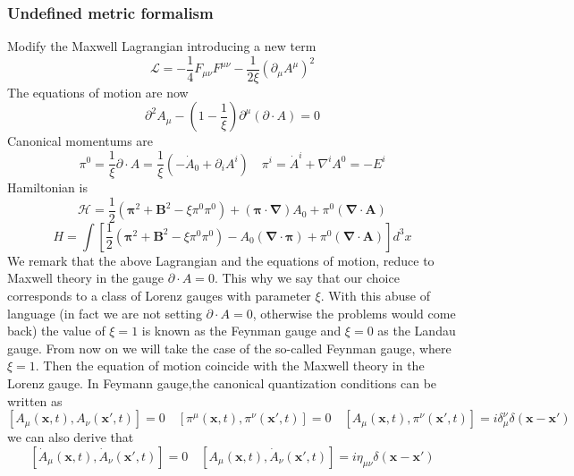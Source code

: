 \subsubsection{Undefined metric formalism}
\noindent
Modify the Maxwell Lagrangian introducing a new term
\[\mathcal{L} = -\frac{1}{4} F_{\mu\nu}F^{\mu\nu} - \frac{1}{2\xi} (\partial_{\mu} A^{\mu})^2\]
The equations of motion are now
\[\partial^2 A_{\mu} - (1-\frac{1}{\xi})\partial^{\mu}(\partial \cdot A) = 0\]
Canonical momentums are
\[\pi^0 = \frac{1}{\xi} \partial \cdot A = \frac{1}{\xi}(-\dot{A}_0 + \partial_i A^i) \quad \pi^i = \dot{A}^i + \nabla^i A^0 = -E^i\]
Hamiltonian is
\[\mathcal{H} = \frac{1}{2}(\bm{\pi}^2 + \bm{B}^2 - \xi \pi^0 \pi^0) + (\bm{\pi} \cdot \bm{\nabla}) A_0 + \pi^0 (\bm{\nabla} \cdot \bm{A})\]
\[H =  \int \left[ \frac{1}{2}(\bm{\pi}^2 + \bm{B}^2 - \xi \pi^0 \pi^0) -A_0(\bm{\nabla} \cdot \bm{\pi}) + \pi^0 (\bm{\nabla} \cdot \bm{A}) \right] d^3x \]
We remark that the above Lagrangian and the equations of motion, reduce to Maxwell theory in the gauge $\partial \cdot A = 0$. This why we say that our choice corresponds to a class of Lorenz gauges with parameter $\xi$. With this abuse of language (in fact we are not setting $\partial \cdot A = 0$, otherwise the problems would come back) the value of $\xi=1$ is known as the Feynman gauge and $\xi=0$ as the Landau gauge. From now on we will take the case of the so-called Feynman gauge, where $\xi=1$. Then the equation of motion coincide with the Maxwell theory in the Lorenz gauge. In Feymann gauge,the canonical quantization conditions can be written as
\[[A_{\mu}(\bm{x},t),A_{\nu}(\bm{x}',t)] = 0 \quad [\pi^{\mu}(\bm{x},t),\pi^{\nu}(\bm{x}',t)] = 0 \quad [A_{\mu}(\bm{x},t),\pi^{\nu}(\bm{x}',t)] = i\delta^{\nu}_{\mu} \delta(\bm{x}-\bm{x}')\]
we can also derive that
\[[\dot{A}_{\mu}(\bm{x},t),\dot{A}_{\nu}(\bm{x}',t)] = 0 \quad [A_{\mu}(\bm{x},t),\dot{A}_{\nu}(\bm{x}',t)] = i\eta_{\mu\nu} \delta(\bm{x}-\bm{x}')\]

